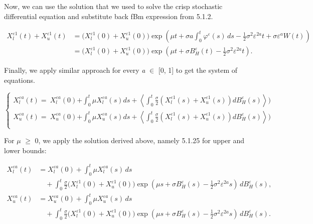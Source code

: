 \documentclass[12pt,a4paper]{report}
\numberwithin{equation}{section}
\begin{document}
Now, we can use the solution that we used to solve the crisp stochastic
differential equation and substitute back fBm expression from 5.1.2.

\[
\begin{aligned}
X_{l}^{\varepsilon 1}(t) + X_{u}^{\varepsilon 1}(t)
&= \bigl(X_{l}^{\varepsilon 1}(0) + X_{u}^{\varepsilon 1}(0)\bigr)
\exp\!\left( \mu t + \sigma a\int_{0}^{t}\varphi^{\varepsilon}(s)\,ds
- \frac{1}{2}\sigma^{2}\varepsilon^{2a}t + \sigma\varepsilon^{a}W(t) \right) \\
&= \bigl(X_{l}^{\varepsilon 1}(0) + X_{u}^{\varepsilon 1}(0)\bigr)
\exp\!\left( \mu t + \sigma B_{H}^{\varepsilon}(t) - \frac{1}{2}\sigma^{2}\varepsilon^{2a}t \right).
\end{aligned}
\tag{5.1.25}
\]


Finally, we apply similar approach for every \emph{a} $\in$ {[}0, 1{]} to
get the system of equations.

\[\left\{ \begin{matrix}
{X_{l}^{\varepsilon a}(t) = \ X_{l}^{\varepsilon a}(0)}{+ \int_{0}^{t}{\mu X_{l}^{\varepsilon a}(s)ds + \left\langle \int_{0}^{t}{\frac{\sigma}{2}(X_{l}^{\varepsilon 1}(s) + X_{u}^{\varepsilon 1}(s))dB_{H}^{\varepsilon}(s)} \right\rangle)}} \\
{X_{u}^{\varepsilon a}(t) = \ X_{u}^{\varepsilon a}(0)}{+ \int_{0}^{t}{\mu X_{u}^{\varepsilon a}(s)ds + \left\langle \int_{0}^{t}{\frac{\sigma}{2}(X_{l}^{\varepsilon 1}(s) + X_{u}^{\varepsilon 1}(s))dB_{H}^{\varepsilon}(s)} \right\rangle)}} \\
\end{matrix} \right.\ \]

For \emph{$\mu$} $\geq$ 0, we apply the solution derived above, namely 5.1.25 for
upper and lower bounds:

\[
\begin{aligned}
X_{l}^{\varepsilon a}(t)
&= X_{l}^{\varepsilon a}(0)
+ \int_{0}^{t}\mu X_{l}^{\varepsilon a}(s)\,ds \\
&\quad + \int_{0}^{t}\frac{\sigma}{2}\bigl(X_{l}^{\varepsilon 1}(0)+X_{u}^{\varepsilon 1}(0)\bigr)
\exp\!\left(\mu s+\sigma B_{H}^{\varepsilon}(s)-\frac{1}{2}\sigma^{2}\varepsilon^{2a}s\right)\,dB_{H}^{\varepsilon}(s),\\[4pt]
X_{u}^{\varepsilon a}(t)
&= X_{u}^{\varepsilon a}(0)
+ \int_{0}^{t}\mu X_{u}^{\varepsilon a}(s)\,ds \\
&\quad + \int_{0}^{t}\frac{\sigma}{2}\bigl(X_{l}^{\varepsilon 1}(0)+X_{u}^{\varepsilon 1}(0)\bigr)
\exp\!\left(\mu s+\sigma B_{H}^{\varepsilon}(s)-\frac{1}{2}\sigma^{2}\varepsilon^{2a}s\right)\,dB_{H}^{\varepsilon}(s).
\end{aligned}
\]
\end{document}
